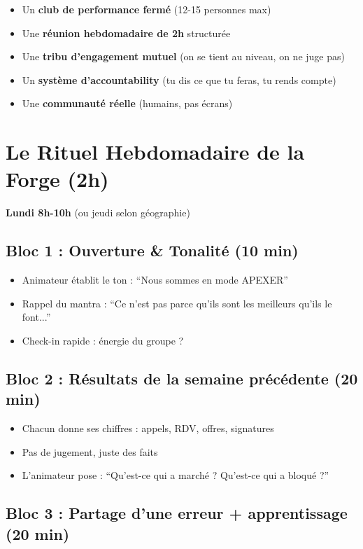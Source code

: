 \documentclass[12pt,a4paper,openany]{book}
\begin{document}
\begin{itemize}
\item Un \textbf{club de performance fermé} (12-15 personnes max)
\item Une \textbf{réunion hebdomadaire de 2h} structurée
\item Une \textbf{tribu d'engagement mutuel} (on se tient au niveau, on ne juge pas)
\item Un \textbf{système d'accountability} (tu dis ce que tu feras, tu rends compte)
\item Une \textbf{communauté réelle} (humains, pas écrans)
\end{itemize}

\section{Le Rituel Hebdomadaire de la Forge (2h)}

\textbf{Lundi 8h-10h} (ou jeudi selon géographie)

\subsection{Bloc 1 : Ouverture \& Tonalité (10 min)}

\begin{itemize}
\item Animateur établit le ton : ``Nous sommes en mode APEXER''
\item Rappel du mantra : ``Ce n'est pas parce qu'ils sont les meilleurs qu'ils le font...''
\item Check-in rapide : énergie du groupe ?
\end{itemize}

\subsection{Bloc 2 : Résultats de la semaine précédente (20 min)}

\begin{itemize}
\item Chacun donne ses chiffres : appels, RDV, offres, signatures
\item Pas de jugement, juste des faits
\item L'animateur pose : ``Qu'est-ce qui a marché ? Qu'est-ce qui a bloqué ?''
\end{itemize}

\subsection{Bloc 3 : Partage d'une erreur + apprentissage (20 min)}
\end{document}

